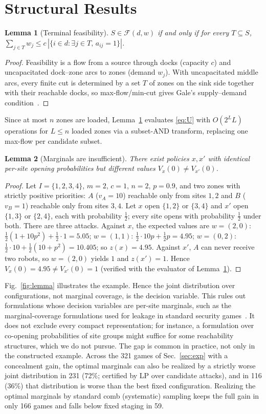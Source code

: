 \documentclass[letterpaper,journal]{IEEEtran}
\newtheorem{lemma}{Lemma}
\theoremstyle{remark}
\begin{document}
\section{Structural Results}\label{sec:theory}
\begin{lemma}[Terminal feasibility]\label{lem:gale}
$S\in\mathcal{F}(d,w)$ if and only if for every $T\subseteq S$, $\sum_{j\in T}w_j\le c\,|\{i\in d:\exists j\in T,\,a_{ij}=1\}|$.
\end{lemma}
\begin{proof}
Feasibility is a flow from a source through docks (capacity $c$) and uncapacitated dock--zone arcs to zones (demand $w_j$). With uncapacitated middle arcs, every finite cut is determined by a set $T$ of zones on the sink side together with their reachable docks, so max-flow/min-cut gives Gale's supply--demand condition~\cite{gale1957}.
\end{proof}
Since at most $n$ zones are loaded, Lemma~\ref{lem:gale} evaluates \eqref{eq:U} with $O(2^{L}L)$ operations for $L\le n$ loaded zones via a subset-AND transform, replacing one max-flow per candidate subset.

\begin{lemma}[Marginals are insufficient]\label{lem:marg}
There exist policies $x,x'$ with identical per-site opening probabilities but different values $V_x(0)\neq V_{x'}(0)$.
\end{lemma}
\begin{proof}
Let $I=\{1,2,3,4\}$, $m=2$, $c=1$, $n=2$, $p=0.9$, and two zones with strictly positive priorities: $A$ ($v_A=10$) reachable only from sites $1,2$ and $B$ ($v_B=1$) reachable only from sites $3,4$. Let $x$ open $\{1,2\}$ or $\{3,4\}$ and $x'$ open $\{1,3\}$ or $\{2,4\}$, each with probability $\tfrac12$; every site opens with probability $\tfrac12$ under both. There are three attacks. Against $x$, the expected values are $w=(2,0)$: $\tfrac12(1+10p^2)+\tfrac12\cdot1=5.05$; $w=(1,1)$: $\tfrac12\cdot10p+\tfrac12p=4.95$; $w=(0,2)$: $\tfrac12\cdot10+\tfrac12(10+p^2)=10.405$; so $z(x)=4.95$. Against $x'$, $A$ can never receive two robots, so $w=(2,0)$ yields $1$ and $z(x')=1$. Hence $V_x(0)=4.95\neq V_{x'}(0)=1$ (verified with the evaluator of Lemma~\ref{lem:gale}).
\end{proof}
Fig.~\ref{fig:lemma} illustrates the example. Hence the joint distribution over configurations, not marginal coverage, is the decision variable. This rules out formulations whose decision variables are per-site marginals, such as the marginal-coverage formulations used for leakage in standard security games~\cite{xu2015leak}. It does not exclude every compact representation; for instance, a formulation over co-opening probabilities of site groups might suffice for some reachability structures, which we do not pursue. The gap is common in practice, not only in the constructed example. Across the 321 games of Sec.~\ref{sec:exp} with a concealment gain, the optimal marginals can also be realized by a strictly worse joint distribution in 231 (72\%; certified by LP over candidate attacks), and in 116 (36\%) that distribution is worse than the best fixed configuration. Realizing the optimal marginals by standard comb (systematic) sampling keeps the full gain in only 166 games and falls below fixed staging in 59.
\end{document}
